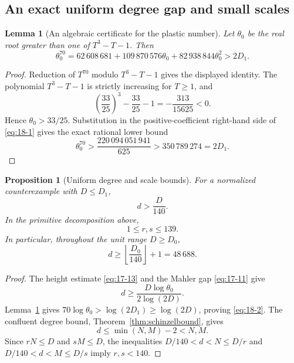 \documentclass[11pt]{article}
\numberwithin{equation}{section}
\newtheorem{proposition}[theorem]{Proposition}
\newtheorem{lemma}[theorem]{Lemma}
\theoremstyle{definition}
\begin{document}
\subsection{An exact uniform degree gap and small scales}

\begin{lemma}[An algebraic certificate for the plastic number]
\label{lem:plasticpower}
Let \(\theta_0\) be the real root greater than one of \(T^3-T-1\).  Then
\begin{equation}
 \theta_0^{70}
 =62\,608\,681+109\,870\,576\theta_0
   +82\,938\,844\theta_0^2
 >2D_1.
 \label{eq:18-1}
\end{equation}
\end{lemma}

\begin{proof}
Reduction of \(T^{70}\) modulo \(T^3-T-1\) gives the displayed identity.
The polynomial \(T^3-T-1\) is strictly increasing for \(T\geq1\), and
\[
 \left(\frac{33}{25}\right)^3-\frac{33}{25}-1
 =-\frac{313}{15625}<0.
\]
Hence \(\theta_0>33/25\).  Substitution in the positive-coefficient
right-hand side of \eqref{eq:18-1} gives the exact rational lower bound
\[
 \theta_0^{70}>
 \frac{220\,094\,051\,941}{625}
 >350\,789\,274=2D_1.
\]
\end{proof}

\begin{proposition}[Uniform degree and scale bounds]
\label{prop:uniformdegree}
For a normalized counterexample with \(D\leq D_1\),
\begin{equation}
 d>\frac D{140}.
 \label{eq:18-2}
\end{equation}
In the primitive decomposition above,
\begin{equation}
 1\leq r,s\leq139.
 \label{eq:18-3}
\end{equation}
In particular, throughout the unit range \(D\geq D_0\),
\[
 d\geq\left\lfloor\frac{D_0}{140}\right\rfloor+1=48\,688.
\]
\end{proposition}

\begin{proof}
The height estimate \eqref{eq:17-13} and the Mahler gap \eqref{eq:17-11} give
\[
 d\geq\frac{D\log\theta_0}{2\log(2D)}.
\]
Lemma~\ref{lem:plasticpower} gives
\(70\log\theta_0>\log(2D_1)\geq\log(2D)\), proving \eqref{eq:18-2}.
The confluent degree bound, Theorem~\ref{thm:schinzelbound}, gives
\[
 d\leq\min(N,M)-2<N,M.
\]
Since \(rN\leq D\) and \(sM\leq D\), the inequalities
\(D/140<d<N\leq D/r\) and \(D/140<d<M\leq D/s\) imply
\(r,s<140\).
\end{proof}
\end{document}
